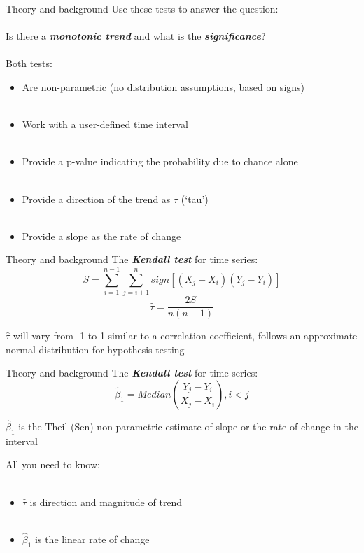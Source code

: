 \documentclass[xcolor=dvipsnames,serif]{beamer}\usepackage[]{graphicx}\usepackage[]{color}
\newcommand{\Bigtxt}[1]{\textbf{\textit{#1}}}
\begin{document}
\begin{frame}[t]{Theory and background}{}
Use these tests to answer the question: \\~\\
Is there a \Bigtxt{monotonic trend} and what is the \Bigtxt{significance}? \\~\\
Both tests:
\vspace{0.1in}
\begin{itemize}
\item Are non-parametric (no distribution assumptions, based on signs) \\~\\
\item<3-> Work with a user-defined time interval \\~\\
\item<4-> Provide a p-value indicating the probability due to chance alone \\~\\
\item<5-> Provide a direction of the trend as $\tau$ (`tau') \\~\\
\item<6-> Provide a slope as the rate of change
\end{itemize}
\end{frame}

\begin{frame}[t]{Theory and background}{}
The \Bigtxt{Kendall test} for time series:
$$S = \sum_{i = 1}^{n - 1}\sum_{j = i + 1}^{n} sign\left[\left(X_j - X_i\right)\left(Y_j - Y_i\right)\right]$$
$$\hat{\tau} = \frac{2S}{n\left(n - 1\right)}$$
\begin{center}
$\hat{\tau}$ will vary from -1 to 1 similar to a correlation coefficient, follows an approximate normal-distribution for hypothesis-testing
\end{center}
\end{frame}

\begin{frame}[t]{Theory and background}{}
The \Bigtxt{Kendall test} for time series:
$$\hat{\beta}_1 = Median\left(\frac{Y_j - Y_i}{X_j - X_i}\right), i < j$$
\begin{center}
$\hat{\beta}_1$ is the Theil (Sen) non-parametric estimate of slope or the rate of change in the interval
\end{center}
All you need to know:\\~\\
\begin{itemize}
\item $\hat{\tau}$ is direction and magnitude of trend \\~\\
\item $\hat{\beta}_1$ is the linear rate of change
\end{itemize}
\end{frame}
\end{document}
